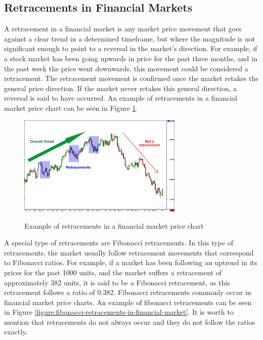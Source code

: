 \subsection{Retracements in Financial Markets}
\label{subsection:retracements-in-financial-markets}

A retracement in a financial market is any market price movement that goes
against a clear trend in a determined timeframe, but where the magnitude is not
significant enough to point to a reversal in the market's direction. For
example, if a stock market has been going upwards in price for the past three
months, and in the past week the price went downwards, this movement could be
considered a retracement. The retracement movement is confirmed once the market
retakes the general price direction. If the market never retakes this general
direction, a reversal is said to have occurred. An example of retracements in a
financial market price chart can be seen in Figure
\ref{figure:retracements-in-financial-market}.

\begin{figure}
\caption{Example of retracements in a financial market price chart} \centering
\includegraphics[width=0.7\textwidth]{img/retracements.png}
\label{figure:retracements-in-financial-market}
\end{figure}

A special type of retracements are Fibonacci retracements. In this type of
retracements, the market usually follow retracement movements that correspond to
Fibonacci ratios. For example, if a market has been following an uptrend in its
prices for the past 1000 units, and the market suffers a retracement of
approximately 382 units, it is said to be a Fibonacci retracement, as this
retracement follows a ratio of 0.382. Fibonacci retracements commonly occur
in financial market price charts. An example of fibonacci retracements can be
seen in Figure \ref{figure:fibonacci-retracements-in-financial-market}. It is
worth to mention that retracements do not always occur and they do not follow
the ratios exactly.

